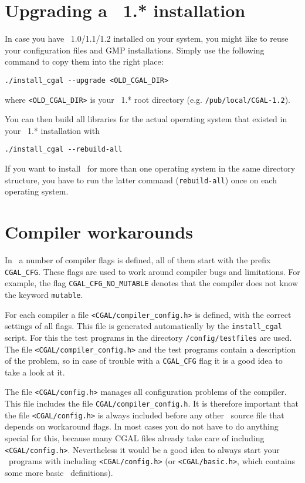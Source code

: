 \section{Upgrading a \cgal\ 1.* installation}
In case you have \cgal\ 1.0/1.1/1.2 installed on your system, you
might like to reuse your configuration files and GMP installations.
Simply use the following command to copy them into the right place:
\begin{verbatim}
./install_cgal --upgrade <OLD_CGAL_DIR>
\end{verbatim}
where \texttt{<OLD\_CGAL\_DIR>} is your \cgal\ 1.* root directory
(e.g. \texttt{/pub/local/CGAL-1.2}).

You can then build all libraries for the actual operating system that
existed in your \cgal\ 1.* installation with 
\begin{verbatim}
./install_cgal --rebuild-all
\end{verbatim}

If you want to install \cgal\ for more than one operating system in
the same directory structure, you have to run the latter command
(\texttt{rebuild-all}) once on each operating system.

\section{Compiler workarounds}
In \cgal\ a number of compiler flags is defined, all of them start
with the prefix \texttt{CGAL\_CFG}. These flags are used to work
around compiler bugs and limitations.  For example, the flag
\texttt{CGAL\_CFG\_NO\_MUTABLE} denotes that the compiler does not
know the keyword \texttt{mutable}. 

For each compiler a file \texttt{<CGAL/compiler\_config.h>} is
defined, with the correct settings of all flags. This file is
generated automatically by the \texttt{install\_cgal} script. For this
the test programs in the directory \texttt{\cgaldir/config/testfiles}
are used. The file \texttt{<CGAL/compiler\_config.h>} and the test
programs contain a description of the problem, so in case of trouble
with a \texttt{CGAL\_CFG} flag it is a good idea to take a look at it.

The file \texttt{<CGAL/config.h>} manages all configuration problems
of the compiler.  This file includes the file
\texttt{CGAL/compiler\_config.h}.  It is therefore important that the
file \texttt{<CGAL/config.h>} is always included before any other
\cgal\ source file that depends on workaround flags. In most cases you
do not have to do anything special for this, because many CGAL files
already take care of including \texttt{<CGAL/config.h>}. Nevertheless
it would be a good idea to always start your \cgal\ programs with
including \texttt{<CGAL/config.h>} (or \texttt{<CGAL/basic.h>}, which
contains some more basic \cgal\ definitions).

